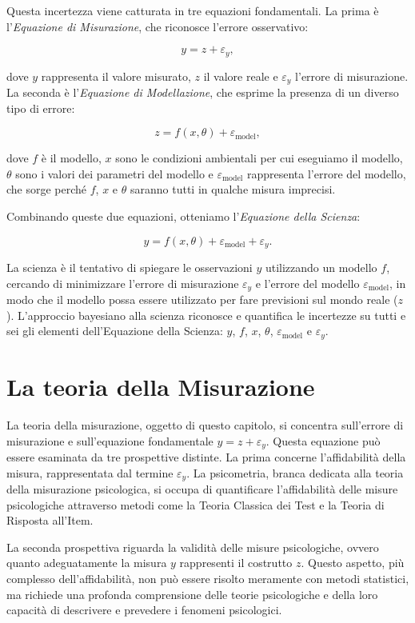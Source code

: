 \documentclass[
  letterpaper,
]{krantz}
\begin{document}
Questa incertezza viene catturata in tre equazioni fondamentali. La
prima è l'\emph{Equazione di Misurazione}, che riconosce l'errore
osservativo:

\[
y = z + \varepsilon_y,
\]

dove \(y\) rappresenta il valore misurato, \(z\) il valore reale e
\(\varepsilon_y\) l'errore di misurazione. La seconda è
l'\emph{Equazione di Modellazione}, che esprime la presenza di un
diverso tipo di errore:

\[
z = f(x, \theta) + \varepsilon_\text{model},
\]

dove \(f\) è il modello, \(x\) sono le condizioni ambientali per cui
eseguiamo il modello, \(\theta\) sono i valori dei parametri del modello
e \(\varepsilon_\text{model}\) rappresenta l'errore del modello, che
sorge perché \(f\), \(x\) e \(\theta\) saranno tutti in qualche misura
imprecisi.

Combinando queste due equazioni, otteniamo l'\emph{Equazione della
Scienza}:

\[
y = f(x, \theta) + \varepsilon_\text{model} + \varepsilon_y.
\]

La scienza è il tentativo di spiegare le osservazioni \(y\) utilizzando
un modello \(f\), cercando di minimizzare l'errore di misurazione
\(\varepsilon_y\) e l'errore del modello \(\varepsilon_\text{model}\),
in modo che il modello possa essere utilizzato per fare previsioni sul
mondo reale (\(z\)). L'approccio bayesiano alla scienza riconosce e
quantifica le incertezze su tutti e sei gli elementi dell'Equazione
della Scienza: \(y\), \(f\), \(x\), \(\theta\),
\(\varepsilon_\text{model}\) e \(\varepsilon_y\).

\section{La teoria della Misurazione}\label{la-teoria-della-misurazione}

La teoria della misurazione, oggetto di questo capitolo, si concentra
sull'errore di misurazione e sull'equazione fondamentale
\(y = z + \varepsilon_y\). Questa equazione può essere esaminata da tre
prospettive distinte. La prima concerne l'affidabilità della misura,
rappresentata dal termine \(\varepsilon_y\). La psicometria, branca
dedicata alla teoria della misurazione psicologica, si occupa di
quantificare l'affidabilità delle misure psicologiche attraverso metodi
come la Teoria Classica dei Test e la Teoria di Risposta all'Item.

La seconda prospettiva riguarda la validità delle misure psicologiche,
ovvero quanto adeguatamente la misura \(y\) rappresenti il costrutto
\(z\). Questo aspetto, più complesso dell'affidabilità, non può essere
risolto meramente con metodi statistici, ma richiede una profonda
comprensione delle teorie psicologiche e della loro capacità di
descrivere e prevedere i fenomeni psicologici.
\end{document}
